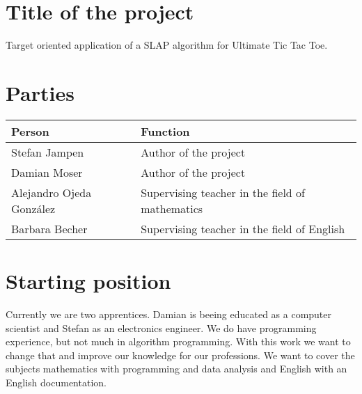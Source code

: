 \section{Title of the project}
Target oriented application of a SLAP algorithm for Ultimate Tic Tac Toe.

\section{Parties}
\begin{tabularx}{\textwidth}{l|X}
\textbf{Person} & \textbf{Function} \\\hline
Stefan Jampen & Author of the project \\
Damian Moser & Author of the project \\
Alejandro Ojeda González & Supervising teacher in the field of mathematics \\
Barbara Becher & Supervising teacher in the field of English \\
\end{tabularx}

\section{Starting position}
Currently we are two apprentices. Damian is beeing educated as a computer scientist and Stefan as an electronics engineer. We do have programming experience, but not much in algorithm programming. With this work we want to change that and improve our knowledge for our professions. We want to cover the subjects mathematics with programming and data analysis and English with an English documentation.


